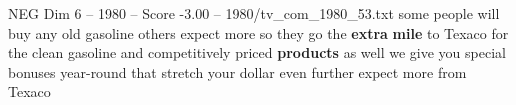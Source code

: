 \begin{textsample}{NEG Dim 6 – 1980 – Score -3.00 – 1980/tv\_com\_1980\_53.txt}  \label{ex:f6_neg_031}
some people will buy any old gasoline others expect more so they go the \textbf{extra} \textbf{mile} to Texaco for the clean gasoline and competitively priced \textbf{products} as well we give you special bonuses year-round that stretch your dollar even further expect more from Texaco

\end{textsample}
